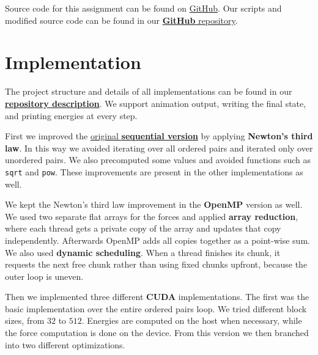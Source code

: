 \documentclass[11pt]{article}
\begin{document}
\maketitle

Source code for this assignment can be found on \href{https://github.com/laspp/HPC/blob/2472513da1348693fd3adbfefac1a6728f4fba4e/labs/04-Assignment3-CUDA/Assignment3.md}{GitHub}. Our scripts and modified source code can be found in our \href{https://github.com/Edelwy/HPC}{\textbf{GitHub} repository}. 

\section{Implementation}

The project structure and details of all implementations can be found in our \href{https://github.com/Edelwy/HPC/blob/3a6c459ccaec52d97bcd7c4595b12c051d74e0f5/Assignment3/readme.md}{\textbf{repository description}}. We support animation output, writing the final state, and printing energies at every step.

First we improved the \href{https://github.com/laspp/HPC/blob/2472513da1348693fd3adbfefac1a6728f4fba4e/labs/04-Assignment3-CUDA/src/lennard-jones/src/lennard-jones.cu}{original \textbf{sequential version}} by applying \textbf{Newton's third law}. In this way we avoided iterating over all ordered pairs and iterated only over unordered pairs. We also precomputed some values and avoided functions such as \texttt{sqrt} and \texttt{pow}. These improvements are present in the other implementations as well.

We kept the Newton's third law improvement in the \textbf{OpenMP} version as well. We used two separate flat arrays for the forces and applied \textbf{array reduction}, where each thread gets a private copy of the array and updates that copy independently. Afterwards OpenMP adds all copies together as a point-wise sum. We also used \textbf{dynamic scheduling}. When a thread finishes its chunk, it requests the next free chunk rather than using fixed chunks upfront, because the outer loop is uneven.

Then we implemented three different \textbf{CUDA} implementations. The first was the basic implementation over the entire ordered pairs loop. We tried different block sizes, from $32$ to $512$. Energies are computed on the host when necessary, while the force computation is done on the device. From this version we then branched into two different optimizations.
\end{document}
